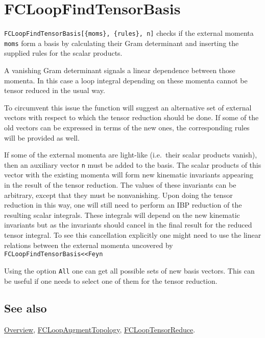 \documentclass[../FeynCalcManual.tex]{subfiles}
\begin{document}
\hypertarget{fcloopfindtensorbasis}{
\section{FCLoopFindTensorBasis}\label{fcloopfindtensorbasis}}

\texttt{FCLoopFindTensorBasis[\allowbreak{}\{\allowbreak{}moms\},\ \allowbreak{}\{\allowbreak{}rules\},\ \allowbreak{}n]}
checks if the external momenta \texttt{moms} form a basis by calculating
their Gram determinant and inserting the supplied rules for the scalar
products.

A vanishing Gram determinant signals a linear dependence between those
momenta. In this case a loop integral depending on these momenta cannot
be tensor reduced in the usual way.

To circumvent this issue the function will suggest an alternative set of
external vectors with respect to which the tensor reduction should be
done. If some of the old vectors can be expressed in terms of the new
ones, the corresponding rules will be provided as well.

If some of the external momenta are light-like (i.e.~their scalar
products vanish), then an auxiliary vector \texttt{n} must be added to
the basis. The scalar products of this vector with the existing momenta
will form new kinematic invariants appearing in the result of the tensor
reduction. The values of these invariants can be arbitrary, except that
they must be nonvanishing. Upon doing the tensor reduction in this way,
one will still need to perform an IBP reduction of the resulting scalar
integrals. These integrals will depend on the new kinematic invariants
but as the invariants should cancel in the final result for the reduced
tensor integral. To see this cancellation explicitly one might need to
use the linear relations between the external momenta uncovered by
\texttt{FCLoopFindTensorBasis<<Feyn}

Using the option \texttt{All} one can get all possible sets of new basis
vectors. This can be useful if one needs to select one of them for the
tensor reduction.

\subsection{See also}

\hyperlink{toc}{Overview},
\hyperlink{fcloopaugmenttopology}{FCLoopAugmentTopology},
\hyperlink{fclooptensorreduce}{FCLoopTensorReduce}.
\end{document}
